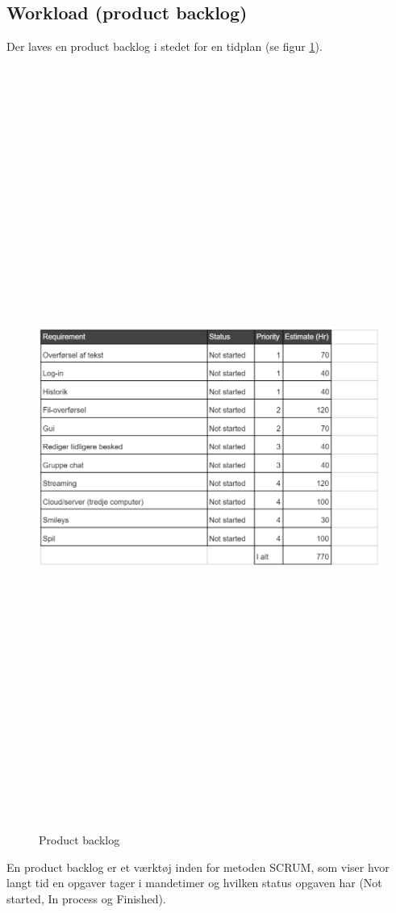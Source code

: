 \subsection{Workload (product backlog)}
Der laves en product backlog i stedet for en tidplan (se figur \ref{fig:workload}).
\begin{figure}[ht]
	\centering
	\includegraphics[width=15cm,height=25cm,keepaspectratio]{pictures/Workload.png}
	\caption{Product backlog}
	\label{fig:workload}
	\end{figure}
\newline
En product backlog er et værktøj inden for metoden SCRUM, som viser hvor langt tid en opgaver tager i mandetimer og hvilken status opgaven har (Not started, In process og Finished).
